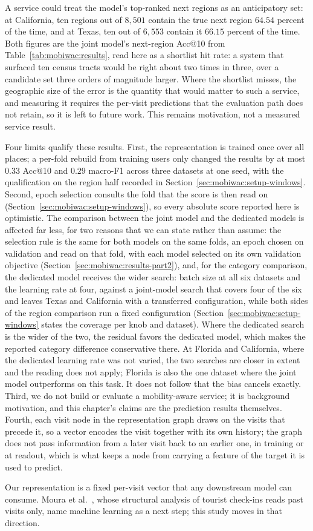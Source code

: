 A service could treat the model's top-ranked next regions as an anticipatory
set: at California, ten regions out of $8{,}501$ contain the true next region $64.54$
percent of the time, and at Texas, ten out of $6{,}553$ contain it $66.15$ percent of the time.
Both figures are the joint model's next-region Acc@10 from
Table~\ref{tab:mobiwac:results}, read here as a shortlist hit rate: a system that surfaced ten
census tracts would be right about two times in three, over a candidate set three orders of
magnitude larger. Where the shortlist misses, the geographic size of the error is the quantity that
would matter to such a service, and measuring it requires the per-visit predictions that the
evaluation path does not retain, so it is left to future work. This remains motivation, not a
measured service result.


Four limits qualify these results. First, the representation is trained once over all places; a
per-fold rebuild from training users only changed the results by at most $0.33$ Acc@10 and $0.29$
macro-F1 across three datasets at one seed, with the qualification on the region half recorded in
Section~\ref{sec:mobiwac:setup-windows}. Second, epoch selection consults the fold that the score is
then read on (Section~\ref{sec:mobiwac:setup-windows}), so every absolute score reported here is optimistic. The
comparison between the joint model and the dedicated models is affected far less, for two reasons that we can state
rather than assume: the selection rule is the same for both models on the same folds, an epoch chosen on validation and read
on that fold, with each model selected on its own validation objective (Section~\ref{sec:mobiwac:results-part2}),
and, for the category comparison, the dedicated model receives the wider search: batch size at all
six datasets and the learning rate at four, against a joint-model search that covers four of the six
and leaves Texas and California with a transferred configuration, while both sides of the region
comparison run a fixed configuration (Section~\ref{sec:mobiwac:setup-windows} states the coverage
per knob and dataset). Where the dedicated search is the wider of the two, the residual favors the
dedicated model, which makes the reported category difference conservative there. At Florida and
California, where the dedicated learning rate was not varied, the two searches are closer in extent
and the reading does not apply; Florida is also the one dataset where the joint model outperforms on
this task. It does not follow that the bias cancels exactly. Third, we do not
build or evaluate a mobility-aware service; it is background motivation, and this chapter's claims are the
prediction results themselves.
Fourth, each
visit node in the representation graph draws on the visits that precede it, so a vector encodes the visit
together with its own history; the graph does not pass information from a later visit back to an earlier
one, in training or at readout, which is what keeps a node from carrying a feature of the target it is
used to predict.

Our representation is a fixed per-visit vector that any downstream model
can consume. Moura et al.~\cite{moura2025mobilityaware}, whose structural
analysis of tourist check-ins reads past visits only, name machine learning
as a next step; this study moves in that direction.
